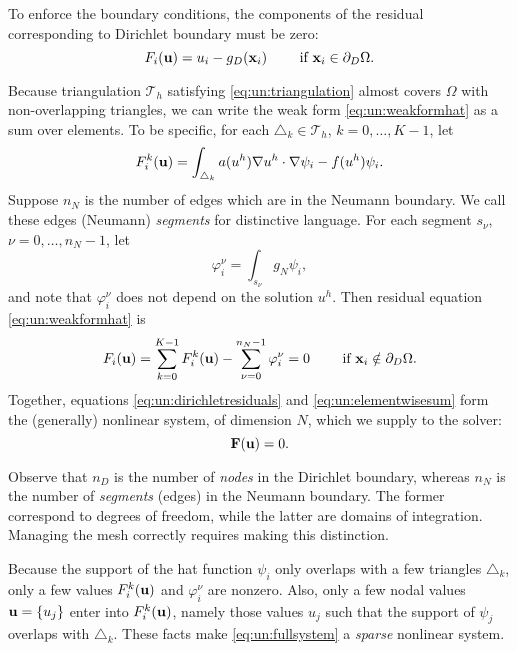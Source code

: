 To enforce the boundary conditions, the components of the residual corresponding to Dirichlet boundary must be zero:
\begin{equation}
F_i(\mathbf{u}) = u_i - g_D(\mathbf{x}_i) \qquad \text{ if } \mathbf{x}_i \in \partial_D\Omega.  \label{eq:un:dirichletresiduals}
\end{equation}

Because triangulation $\mathcal{T}_h$ satisfying \eqref{eq:un:triangulation} almost covers $\Omega$ with non-overlapping triangles, we can write the weak form \eqref{eq:un:weakformhat} as a sum over elements.  To be specific, for each $\triangle_k \in \mathcal{T}_h$, $k=0,\dots,K-1$, let
\begin{equation}
F_i^k(\mathbf{u}) = \int_{\triangle_k} a(u^h) \nabla u^h \cdot \nabla \psi_i - f(u^h) \psi_i.  \label{eq:un:elementweakform}
\end{equation}
Suppose $n_N$ is the number of edges which are in the Neumann boundary.  We call these edges (Neumann) \emph{segments} for distinctive language.  For each segment $s_\nu$, $\nu=0,\dots,n_N-1$, let
\begin{equation}
\varphi_i^\nu = \int_{s_\nu} g_N \psi_i,  \label{eq:un:segmentweakform}
\end{equation}
and note that $\varphi_i^\nu$ does not depend on the solution $u^h$.  Then residual equation \eqref{eq:un:weakformhat} is
\begin{equation}
F_i(\mathbf{u}) = \sum_{k=0}^{K-1} F_i^k(\mathbf{u}) - \sum_{\nu=0}^{n_N-1} \varphi_i^\nu = 0  \qquad \text{ if } \mathbf{x}_i \notin \partial_D\Omega. \label{eq:un:elementwisesum}
\end{equation}
Together, equations \eqref{eq:un:dirichletresiduals} and \eqref{eq:un:elementwisesum} form the (generally) nonlinear system, of dimension $N$, which we supply to the \pSNES solver:
\begin{equation}
\mathbf{F}(\mathbf{u})=0. \label{eq:un:fullsystem}
\end{equation}

Observe that $n_D$ is the number of \emph{nodes} in the Dirichlet boundary, whereas $n_N$ is the number of \emph{segments} (edges) in the Neumann boundary.  The former correspond to degrees of freedom, while the latter are domains of integration.  Managing the mesh correctly requires making this distinction.

Because the support of the hat function $\psi_i$ only overlaps with a few triangles $\triangle_k$, only a few values $F_i^k(\mathbf{u})$ and $\varphi_i^\nu$ are nonzero.  Also, only a few nodal values $\mathbf{u}=\{u_j\}$ enter into $F_i^k(\mathbf{u})$, namely those values $u_j$ such that the support of $\psi_j$ overlaps with $\triangle_k$.  These facts make \eqref{eq:un:fullsystem} a \emph{sparse} nonlinear system.

